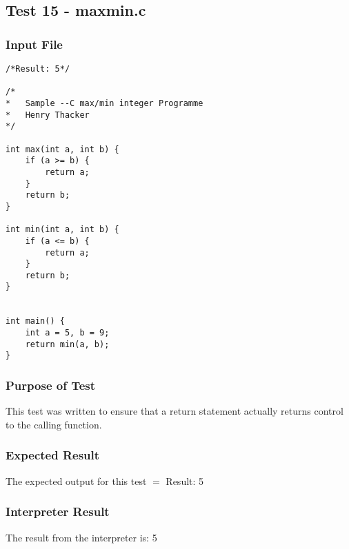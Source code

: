 \subsection{Test 15 - maxmin.c}
\subsubsection{Input File}
\begin{lstlisting}[showstringspaces=false,breaklines=true,backgroundcolor=\color{light-gray}, captionpos=b]
/*Result: 5*/

/*
*	Sample --C max/min integer Programme
*	Henry Thacker
*/

int max(int a, int b) {
	if (a >= b) {
		return a;
	}
	return b;
}

int min(int a, int b) {
	if (a <= b) {
		return a;
	}
	return b;
}


int main() {
	int a = 5, b = 9;
	return min(a, b);
}
\end{lstlisting}\subsubsection{Purpose of Test}
This test was written to ensure that a return statement actually returns control to the calling function.

\subsubsection{Expected Result}
The expected output for this test $=$ Result: 5
\subsubsection{Interpreter Result}
The result from the interpreter is: 5
